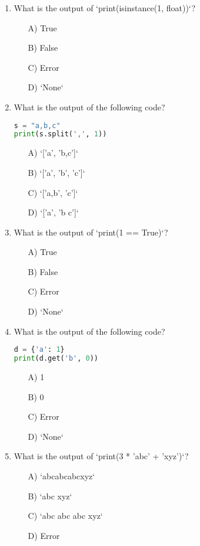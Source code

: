 \documentclass[9pt]{article}
\begin{document}
\begin{multicols}{2}
\begin{enumerate}
\item What is the output of `print(isinstance(1, float))`?
\begin{enumerate}
\item[A)] True
\item[B)] False
\item[C)] Error
\item[D)] `None`
\end{enumerate}

\item What is the output of the following code?
\begin{lstlisting}[language=Python]
s = "a,b,c"
print(s.split(',', 1))
\end{lstlisting}
\begin{enumerate}
\item[A)] `['a', 'b,c']`
\item[B)] `['a', 'b', 'c']`
\item[C)] `['a,b', 'c']`
\item[D)] `['a', 'b c']`
\end{enumerate}

\item What is the output of `print(1 == True)`?
\begin{enumerate}
\item[A)] True
\item[B)] False
\item[C)] Error
\item[D)] `None`
\end{enumerate}

\item What is the output of the following code?
\begin{lstlisting}[language=Python]
d = {'a': 1}
print(d.get('b', 0))
\end{lstlisting}
\begin{enumerate}
\item[A)] 1
\item[B)] 0
\item[C)] Error
\item[D)] `None`
\end{enumerate}

\item What is the output of `print(3 * 'abc' + 'xyz')`?
\begin{enumerate}
\item[A)] `abcabcabcxyz`
\item[B)] `abc xyz`
\item[C)] `abc abc abc xyz`
\item[D)] Error
\end{enumerate}


\end{enumerate}
\end{multicols}
\end{document}
